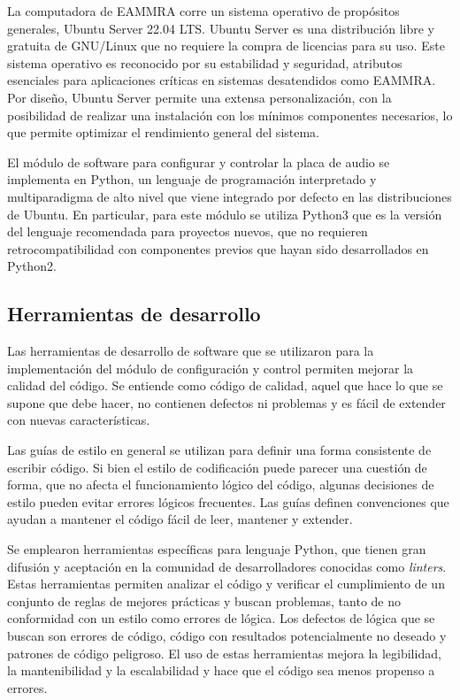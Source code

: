 La computadora de EAMMRA corre un sistema operativo de propósitos generales, Ubuntu Server 22.04 LTS. Ubuntu Server es una distribución libre y gratuita de GNU/Linux que no requiere la compra de licencias para su uso. Este sistema operativo es reconocido por su estabilidad y seguridad, atributos esenciales para aplicaciones críticas en sistemas desatendidos como EAMMRA. Por diseño, Ubuntu Server permite una extensa personalización, con la posibilidad de realizar una instalación con los mínimos componentes necesarios, lo que permite optimizar el rendimiento general del sistema.

El módulo de software para configurar y controlar la placa de audio se implementa en Python, un lenguaje de programación interpretado y multiparadigma de alto nivel que viene integrado por defecto en las distribuciones de Ubuntu. En particular, para este módulo se utiliza Python3 que es la versión del lenguaje recomendada para proyectos nuevos, que no requieren retrocompatibilidad con componentes previos que hayan sido desarrollados en Python2.


\subsection{Herramientas de desarrollo}

Las herramientas de desarrollo de software que se utilizaron para la implementación del módulo de configuración y control permiten mejorar la calidad del código. Se entiende como código de calidad, aquel que hace lo que se supone que debe hacer, no contienen defectos ni problemas y es fácil de extender con nuevas características.

Las guías de estilo en general se utilizan para definir una forma consistente de escribir código. Si bien el estilo de codificación puede parecer una cuestión de forma, que no afecta el funcionamiento lógico del código, algunas decisiones de estilo pueden evitar errores lógicos frecuentes. Las guías definen convenciones que ayudan a mantener el código fácil de leer, mantener y extender.

Se emplearon herramientas específicas para lenguaje Python, que tienen gran difusión y aceptación en la comunidad de desarrolladores conocidas como \textit{linters}.  Estas herramientas permiten analizar el código y verificar el cumplimiento de un conjunto de reglas de mejores prácticas y buscan problemas, tanto de no conformidad con un estilo como errores de lógica.  Los defectos de lógica que se buscan son errores de código, código con resultados potencialmente no deseado y patrones de código peligroso. El uso de estas herramientas mejora la legibilidad, la mantenibilidad y la escalabilidad y hace que el código sea menos propenso a errores.   


